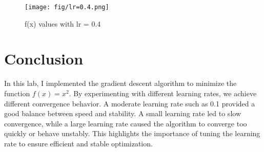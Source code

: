 \documentclass[hidelinks]{report}
\begin{document}
\begin{figure}
    \centering
    \texttt{[image: fig/lr=0.4.png]}
    \caption{f(x) values with lr = 0.4}
    \label{fig:enter-label}
\end{figure}

\chapter{Conclusion}
In this lab, I implemented the gradient descent algorithm to minimize the function $f(x) = x^2$. By experimenting with different learning rates,  we achieve different convergence behavior. A moderate learning rate such as 0.1 provided a good balance between speed and stability. A small learning rate led to slow convergence, while a large learning rate caused the algorithm to converge too quickly or behave unstably. This highlights the importance of tuning the learning rate to ensure efficient and stable optimization.
\end{document}
